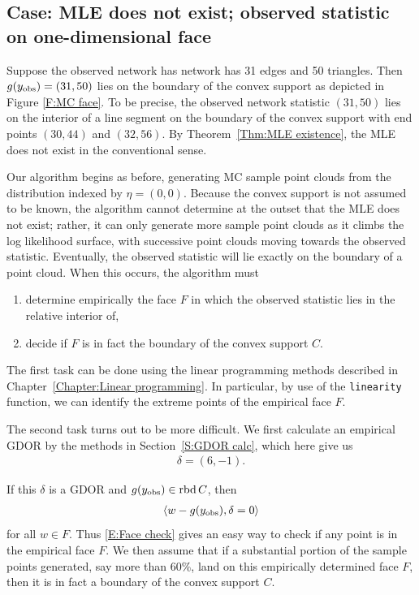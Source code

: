 \subsection{Case: MLE does not exist; observed statistic on one-dimensional face}
Suppose the observed network has network has 31 edges and 50 triangles.  Then 
$g(y_{\text{obs}}) = (31,50)$ lies on the boundary of the convex support as depicted in 
Figure \ref{F:MC face}.  To be precise, the observed network statistic $(31,50)$ lies 
on the interior of a line segment on the boundary of the convex support with 
end points $(30,44)$ and $(32,56)$. 
By Theorem~\ref{Thm:MLE existence}, the MLE does not exist
in the conventional sense.

Our algorithm begins as before, generating MC sample point clouds 
from the distribution indexed by $\eta = (0,0)$.  Because the convex 
support is not assumed to be known, 
the algorithm cannot determine at the outset that the MLE does 
not exist; rather, it can only generate more sample point clouds as it climbs the log 
likelihood surface, with successive point clouds moving towards the observed statistic.
Eventually, the observed statistic will lie exactly on the boundary of a point cloud.
When this occurs, the algorithm must 
\begin{enumerate}
\item determine empirically the face $F$ in which the observed statistic lies in the 
relative interior of,
\item decide if $F$ is in fact the boundary of the convex support $C$.
\end{enumerate}  

The first task can be done using the linear programming methods 
described in Chapter~\ref{Chapter:Linear programming}.  
In particular, by use of the \texttt{linearity} function, we can identify the 
extreme points of the empirical face $F$.
 

The second task turns out to be more difficult.  
We first calculate an empirical GDOR by the methods in Section~\ref{S:GDOR calc}, which here give us
\begin{align*}
	\delta = (6,-1).
\end{align*}

If this $\delta$ is a GDOR and $g(y_{\text{obs}}) \in \operatorname{rbd} C$, then 
\begin{align} \label{E:Face check}
	\langle w - g(y_{\text{obs}}), \delta=0 \rangle
\end{align}
for all $w \in F$.  
Thus \eqref{E:Face check} gives an easy way to check if 
any point is in the empirical face $F$.
We then assume that if a substantial portion of the sample points generated, say 
more than 60\%, land on this empirically determined face $F$, then it is in fact a boundary of 
the convex support $C$.  

